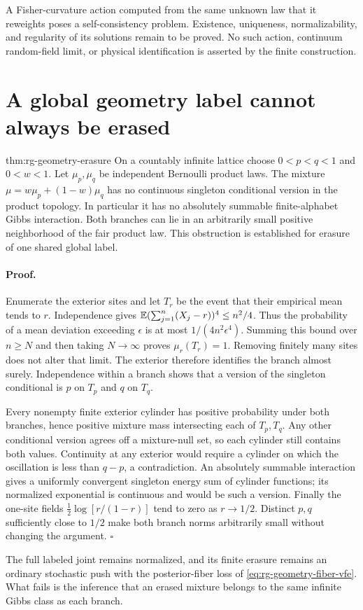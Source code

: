 A Fisher-curvature action computed from the same unknown law that it
reweights poses a self-consistency problem. Existence, uniqueness,
normalizability, and regularity of its solutions remain to be proved.
No such action, continuum random-field limit, or physical identification is
asserted by the finite construction. 

\section{A global geometry label cannot always be erased}
\label{sec:rg-geometry-erasure}

{thm:rg-geometry-erasure}
On a countably infinite lattice choose $0<p<q<1$ and $0<w<1$. Let
$\mu_p,\mu_q$ be independent Bernoulli product laws. The mixture
$\mu=w\mu_p+(1-w)\mu_q$ has no continuous singleton conditional version
in the product topology. In particular it has no absolutely summable
finite-alphabet Gibbs interaction. Both branches can lie in an arbitrarily
small positive neighborhood of the fair product law. This obstruction is
established for erasure of one shared global label. 

\paragraph{Proof.}
Enumerate the exterior sites and let $T_r$ be the event that their empirical
mean tends to $r$. Independence gives
$\mathbb E(\sum_{j=1}^n(X_j-r))^4\leq n^2/4$. Thus the probability of a mean
deviation exceeding $\epsilon$ is at most $1/(4n^2\epsilon^4)$.
Summing this bound over $n\geq N$ and then taking $N\to\infty$ proves
$\mu_r(T_r)=1$. Removing finitely many sites does not alter that limit.
The exterior therefore identifies the branch almost surely. Independence
within a branch shows that a version of the singleton conditional is $p$
on $T_p$ and $q$ on $T_q$.

Every nonempty finite exterior cylinder has positive probability under
both branches, hence positive mixture mass intersecting each of $T_p,T_q$.
Any other conditional version agrees off a mixture-null set, so each
cylinder still contains both values. Continuity at any exterior would
require a cylinder on which the oscillation is less than $q-p$, a
contradiction. An absolutely summable interaction gives a uniformly
convergent singleton energy sum of cylinder functions; its normalized
exponential is continuous and would be such a version. Finally the
one-site fields $\tfrac12\log[r/(1-r)]$ tend to zero as $r\to1/2$.
Distinct $p,q$ sufficiently close to $1/2$ make both branch norms
arbitrarily small without changing the argument.
$\square$

The full labeled joint remains normalized, and its finite erasure remains
an ordinary stochastic push with the posterior-fiber loss of
\cref{eq:rg-geometry-fiber-vfe}. What fails is the inference that an erased
mixture belongs to the same infinite Gibbs class as each branch.
